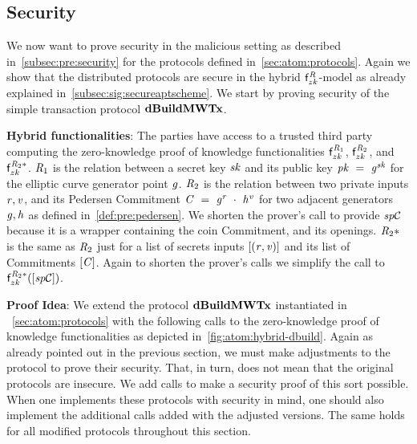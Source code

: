 \subsection{Security}\label{subsec:atom:security}

We now want to prove security in the malicious setting as described in~\cref{subsec:pre:security} for the protocols defined in~\cref{sec:atom:protocols}.
Again we show that the distributed protocols are secure in the hybrid $\mathsf{f}^{\mathit{R}}_{zk}$-model as already explained in~\cref{subsec:sig:secureaptscheme}.
We start by proving security of the simple transaction protocol $\mathbf{dBuildMWTx}$.

\textbf{Hybrid functionalities}: The parties have access to a trusted third party computing the zero-knowledge proof of knowledge functionalities $\mathsf{f}^{\mathit{R}_1}_{zk}$, $\mathsf{f}^{\mathit{R}_2}_{zk}$, and $\mathsf{f}^{\mathit{R}_2*}_{zk}$.
$\mathit{R}_1$ is the relation between a secret key $\mathit{sk}$ and its public key $\mathit{pk} ~=~ \mathit{g}^{\mathit{sk}}$ for the elliptic curve generator point $\mathit{g}$.
$\mathit{R}_2$ is the relation between two private inputs $\mathit{r}, \mathit{v}$, and its Pedersen Commitment $\mathit{C} ~=~ \mathit{g}^{\mathit{r}} ~\cdot~ \mathit{h}^{\mathit{v}}$ for two adjacent generators $\mathit{g}, \mathit{h}$ as defined in~\cref{def:pre:pedersen}.
We shorten the prover's call to provide $\mathit{sp}\mathcal{C}$ because it is a wrapper containing the coin Commitment, and its openings.
$\mathit{R}_2*$ is the same as $\mathit{R}_2$ just for a list of secrets inputs $[(\mathit{r}, \mathit{v})]$ and its list of Commitments $[\mathit{C}]$.
Again to shorten the prover's calls we simplify the call to $\mathsf{f}^{\mathit{R}_2*}_{zk}([\mathit{sp}\mathcal{C}])$.

\textbf{Proof Idea}: We extend the protocol $\mathbf{dBuildMWTx}$ instantiated in ~\cref{sec:atom:protocols} with the following calls to the zero-knowledge proof of knowledge functionalities as depicted in~\cref{fig:atom:hybrid-dbuild}.
Again as already pointed out in the previous section, we must make adjustments to the protocol to prove their security.
That, in turn, does not mean that the original protocols are insecure.
We add calls to make a security proof of this sort possible.
When one implements these protocols with security in mind, one should also implement the additional calls added with the adjusted versions.
The same holds for all modified protocols throughout this section.

